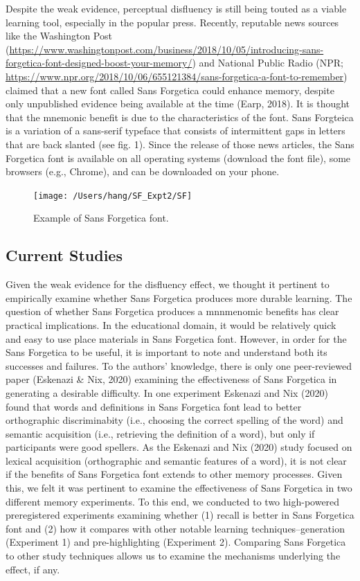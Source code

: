 \documentclass[english,pdf]{apa6}
\begin{document}
Despite the weak evidence, perceptual disfluency is still being touted as a viable learning tool, especially in the popular press. Recently, reputable news sources like the Washington Post (\url{https://www.washingtonpost.com/business/2018/10/05/introducing-sans-forgetica-font-designed-boost-your-memory/}) and National Public Radio (NPR; \url{https://www.npr.org/2018/10/06/655121384/sans-forgetica-a-font-to-remember}) claimed that a new font called Sans Forgetica could enhance memory, despite only unpublished evidence being available at the time (Earp, 2018). It is thought that the mnemonic benefit is due to the characteristics of the font. Sans Forgteica is a variation of a sans-serif typeface that consists of intermittent gaps in letters that are back slanted (see fig. 1). Since the release of those news articles, the Sans Forgetica font is available on all operating systems (download the font file), some browsers (e.g., Chrome), and can be downloaded on your phone.

\begin{figure}
\texttt{[image: /Users/hang/SF\_Expt2/SF]} \caption{Example of Sans Forgetica font. }\label{fig:unnamed-chunk-1}
\end{figure}

\hypertarget{current-studies}{%
\subsection{Current Studies}\label{current-studies}}

Given the weak evidence for the disfluency effect, we thought it pertinent to empirically examine whether Sans Forgetica produces more durable learning. The question of whether Sans Forgetica produces a mnnmenomic benefits has clear practical implications. In the educational domain, it would be relatively quick and easy to use place materials in Sans Forgetica font. However, in order for the Sans Forgetica to be useful, it is important to note and understand both its successes and failures. To the authors' knowledge, there is only one peer-reviewed paper (Eskenazi \& Nix, 2020) examining the effectiveness of Sans Forgetica in generating a desirable difficulty. In one experiment Eskenazi and Nix (2020) found that words and definitions in Sans Forgetica font lead to better orthographic discriminabity (i.e., choosing the correct spelling of the word) and semantic acquisition (i.e., retrieving the definition of a word), but only if participants were good spellers. As the Eskenazi and Nix (2020) study focused on lexical acquisition (orthographic and semantic features of a word), it is not clear if the benefits of Sans Forgetica font extends to other memory processes. Given this, we felt it was pertinent to examine the effectiveness of Sans Forgetica in two different memory experiments. To this end, we conducted to two high-powered preregistered experiments examining whether (1) recall is better in Sans Forgetica font and (2) how it compares with other notable learning techniques--generation (Experiment 1) and pre-highlighting (Experiment 2). Comparing Sans Forgetica to other study techniques allows us to examine the mechanisms underlying the effect, if any.
\end{document}
